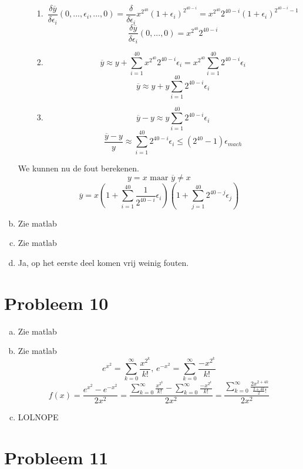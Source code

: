 \documentclass[12pt,a4paper]{article}
\begin{document}
\begin{enumerate}[(a)]
\begin{enumerate}
\begin{enumerate}
\item
\[
\frac{\delta \overline{y}}{\delta\epsilon_i}(0,...,\epsilon_i,...,0)
= \frac{\delta}{\delta\epsilon_i}
x^{2^{40}} (1+\epsilon_{i})^{2^{40-i}}
= x^{2^{40}} 2^{40-i}(1+\epsilon_{i})^{2^{40-i}-1}
\]
\[
\frac{\delta \overline{y}}{\delta\epsilon_i}(0,...,0)
= x^{2^{40}} 2^{40-i}
\]

\item
\[
\overline{y} \approx y +
\sum_{i=1}^{40} x^{2^{40}} 2^{40-i} \epsilon_i
= x^{2^{40}} \sum_{i=1}^{40} 2^{40-i} \epsilon_i
\]
\[
\overline{y} \approx y +
y \sum_{i=1}^{40} 2^{40-i} \epsilon_i
\]

\item
\[
\overline{y}-y \approx
y \sum_{i=1}^{40} 2^{40-i} \epsilon_i
\]
\[
\frac{\overline{y}-y}{y} \approx
\sum_{i=1}^{40} 2^{40-i} \epsilon_i
\le \left(2^{40}-1\right)\epsilon_{mach}
\]

\end{enumerate}
\end{enumerate}
We kunnen nu de fout berekenen.
\[
y = x \text{ maar } \overline{y} \neq x
\]
\[
\overline{y} = 
x
\left(
1+\sum_{i=1}^{40}
\frac{1}{2^{40-i}}
\epsilon_i
\right)
\left(
1+
\sum_{j=1}^{40}
2^{40-j} \epsilon_j
\right)
\]

\item Zie matlab
\item Zie matlab
\item Ja, op het eerste deel komen vrij weinig fouten.


\end{enumerate}

\section{Probleem 10}
\begin{enumerate}[(a)]
\item Zie matlab
\item Zie matlab
\[
e^{x^{2}} = \sum_{k=0}^{\infty}\frac{x^{2^{k}}}{k!} \text{, } e^{-x^{2}} = \sum_{k=0}^{\infty}\frac{-x^{2^{k}}}{k!}
\]
\[
f(x) = \frac{e^{x^{2}}-e^{-x^{2}}}{2x^2} = \frac{\sum_{k=0}^{\infty}\frac{x^{2^{k}}}{k!} - \sum_{k=0}^{\infty}\frac{-x^{2^{k}}}{k!}}{2x^2}
= \frac{\sum_{k=0}^{\infty}\frac{2x^{2+4k}}{\frac{2+4k}{2}!}}{2x^2}
\]
\item LOLNOPE

\end{enumerate}

\section{Probleem 11}
\end{document}

